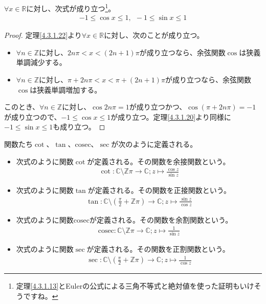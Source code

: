 \documentclass[dvipdfmx]{jsarticle}
\begin{document}
\begin{thm}\label{4.3.1.24}
$\forall x \in \mathbb{R}$に対し、次式が成り立つ\footnote{定理\ref{4.3.1.13}とEulerの公式による三角不等式と絶対値を使った証明もいけそうですね。}。
\begin{align*}
- 1 \leq \cos x \leq 1,\ \  - 1 \leq \sin x \leq 1
\end{align*}
\end{thm}
\begin{proof} 定理\ref{4.3.1.22}より$\forall x \in \mathbb{R}$に対し、次のことが成り立つ。
\begin{itemize}
\item
  $\forall n \in \mathbb{Z}$に対し、$2n\pi < x < (2n + 1)\pi$が成り立つなら、余弦関数$\cos$は狭義単調減少する。
\item
  $\forall n \in \mathbb{Z}$に対し、$\pi + 2n\pi < x < \pi + (2n + 1)\pi$が成り立つなら、余弦関数$\cos$は狭義単調増加する。
\end{itemize}
このとき、$\forall n \in \mathbb{Z}$に対し、$\cos{2n\pi} = 1$が成り立つかつ、$\cos(\pi + 2n\pi) = - 1$が成り立つので、$- 1 \leq \cos x \leq 1$が成り立つ。定理\ref{4.3.1.20}より同様に$- 1 \leq \sin x \leq 1$も成り立つ。
\end{proof}
\begin{dfn}
関数たち$\cot$、$\tan$、$\mathrm{cosec}$、$\sec$が次のように定義される。
\begin{itemize}
\item
  次式のように関数$\cot$が定義される。その関数を余接関数という。
\begin{align*}
\cot:\mathbb{C} \setminus \mathbb{Z}\pi \rightarrow \mathbb{C};z \mapsto \frac{\cos z}{\sin z}
\end{align*}
\item
  次式のように関数$\tan$が定義される。その関数を正接関数という。
\begin{align*}
\tan:\mathbb{C} \setminus \left( \frac{\pi}{2} + \mathbb{Z}\pi \right) \rightarrow \mathbb{C};z \mapsto \frac{\sin z}{\cos z}
\end{align*}
\item
  次式のように関数$\mathrm{cosec}$が定義される。その関数を余割関数という。
\begin{align*}
\mathrm{cosec}:\mathbb{C} \setminus \mathbb{Z}\pi \rightarrow \mathbb{C};z \mapsto \frac{1}{\sin z}
\end{align*}
\item
  次式のように関数$\sec$が定義される。その関数を正割関数という。
\begin{align*}
\sec:\mathbb{C} \setminus \left( \frac{\pi}{2} + \mathbb{Z}\pi \right) \rightarrow \mathbb{C};z \mapsto \frac{1}{\cos z}
\end{align*}
\end{itemize}
\end{dfn}
\end{document}
